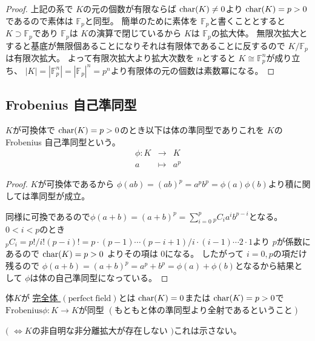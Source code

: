 \documentclass[../master_galois_theory]{subfiles}
\begin{document}
\begin{proof}
  上記の系で $K$の元の個数が有限ならば $\mathrm{char}(K) \neq 0$より $\mathrm{char}(K) = p > 0$
  であるので素体は $\mathbb{F}_p$と同型。
  簡単のために素体を $\mathbb{F}_p$と書くこととすると $K \supset \mathbb{F}_p$であり $\mathbb{F}_p$は $K$の演算で閉じているから $K$は $\mathbb{F}_p$の拡大体。
  無限次拡大とすると基底が無限個あることになりそれは有限体であることに反するので $K/\mathbb{F}_p$は有限次拡大。
  よって有限次拡大より拡大次数を $n$とすると $K \cong \mathbb{F}_p^n$が成り立ち、
  $|K| = |\mathbb{F}_p^n| = |\mathbb{F}_p|^n = p^n$より有限体の元の個数は素数冪になる。
\end{proof}

\subsection{Frobenius 自己準同型}

\begin{defi}
  $K$が可換体で $\mathrm{char}(K) = p > 0$のとき以下は体の準同型でありこれを $K$の \rm{Frobenius} 自己準同型という。
  \begin{eqnarray*}
    \phi : K & \longrightarrow & K \\
    a & \longmapsto & a^p
  \end{eqnarray*}
\end{defi}

\begin{proof}
  $K$が可換体であるから
  $\phi(ab) = (ab)^p = a^p b^p = \phi(a)\phi(b)$より積に関しては準同型が成立。

  同様に可換であるので$\phi(a + b) = (a + b)^p = \sum_{i = 0}^p {}_p C_i a^i b^{p-i}$となる。
  $0 < i < p$のとき ${}_p C_i = p! / i!(p-i)! = p \cdot (p-1) \cdots (p-i+1) / i \cdot (i-1) \cdots 2 \cdot 1$より $p$が係数にあるので $\mathrm{char}(K) = p > 0$
  よりその項は $0$になる。
  したがって $i = 0 , p$の項だけ残るので $\phi(a + b) = (a + b)^p = a^p + b^p = \phi(a) + \phi(b)$となるから結果として $\phi$は体の自己準同型になっている。
\end{proof}

\begin{defi}
  体$K$が \underline{完全体 $(\mathrm{perfect \  field})$}とは
  $\mathrm{char}(K) = 0$または $\mathrm{char}(K) = p > 0$で
  $\mathrm{Frobenius} \phi : K \longrightarrow K$が同型 $(もともと体の準同型より全射であるということ)$

  $($ $\Leftrightarrow K$の非自明な非分離拡大が存在しない $)$これは示さない。
\end{defi}
\end{document}
